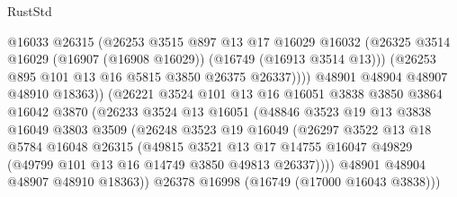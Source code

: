 \begin{lexlean}{RustStd}
\begin{coremodule}
                              @16033
                              @26315
                              (@26253
                                @3515
                                @897
                                @13
                                @17
                                @16029
                                @16032
                                (@26325
                                  @3514
                                  @16029
                                  (@16907 (@16908 @16029))
                                  (@16749 (@16913 @3514 @13)))
                                (@26253 @895 @101 @13 @16 @5815 @3850 @26375 @26337))))
                          @48901
                          @48904
                          @48907
                          @48910
                          @18363))
                      (@26221
                        @3524
                        @101
                        @13
                        @16
                        @16051
                        @3838
                        @3850
                        @3864
                        @16042
                        @3870
                        (@26233
                          @3524
                          @13
                          @16051
                          (@48846
                            @3523
                            @19
                            @13
                            @3838
                            @16049
                            @3803
                            @3509
                            (@26248
                              @3523
                              @19
                              @16049
                              (@26297
                                @3522
                                @13
                                @18
                                @5784
                                @16048
                                @26315
                                (@49815
                                  @3521
                                  @13
                                  @17
                                  @14755
                                  @16047
                                  @49829
                                  (@49799 @101 @13 @16 @14749 @3850 @49813 @26337))))
                            @48901
                            @48904
                            @48907
                            @48910
                            @18363))
                        @26378
                        @16998
                        (@16749 (@17000 @16043 @3838)))

\end{coremodule}
\end{lexlean}
